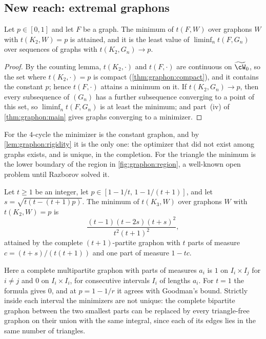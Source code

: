 \begin{refsection}
\subsection{New reach: extremal graphons}

\begin{corollary}\label{cor:graphon:extremal}
Let $p\in[0,1]$ and let $F$ be a graph. The minimum of $t(F,W)$ over graphons $W$ with $t(K_2,W)=p$ is attained, and it is the least value of $\liminf_n t(F,G_n)$ over sequences of graphs with $t(K_2,G_n)\to p$.
\end{corollary}

\begin{proof}
By the counting lemma, $t(K_2,\cdot)$ and $t(F,\cdot)$ are continuous on $\graphonspace$, so the set where $t(K_2,\cdot)=p$ is compact (\cref{thm:graphon:compact}), and it contains the constant $p$; hence $t(F,\cdot)$ attains a minimum on it. If $t(K_2,G_n)\to p$, then every subsequence of $(G_n)$ has a further subsequence converging to a point of this set, so $\liminf_nt(F,G_n)$ is at least the minimum; and part~(iv) of \cref{thm:graphon:main} gives graphs converging to a minimizer.
\end{proof}

For the $4$-cycle the minimizer is the constant graphon, and by \cref{lem:graphon:rigidity} it is the only one: the optimizer that did not exist among graphs exists, and is unique, in the completion. For the triangle the minimum is the lower boundary of the region in \cref{fig:graphon:region}, a well-known open problem until Razborov solved it.

\begin{theorem}\label{thm:graphon:razborov}
Let $t\ge1$ be an integer, let $p\in[1-1/t,\,1-1/(t+1)]$, and let $s=\sqrt{t(t-(t+1)p)}$. The minimum of $t(K_3,W)$ over graphons $W$ with $t(K_2,W)=p$ is
\[
  \frac{(t-1)(t-2s)(t+s)^2}{t^2(t+1)^2},
\]
attained by the complete $(t+1)$-partite graphon with $t$ parts of measure $c=(t+s)/(t(t+1))$ and one part of measure $1-tc$.
\end{theorem}

Here a complete multipartite graphon with parts of measures $a_i$ is $1$ on $I_i\times I_j$ for $i\ne j$ and $0$ on $I_i\times I_i$, for consecutive intervals $I_i$ of lengths $a_i$. For $t=1$ the formula gives $0$, and at $p=1-1/r$ it agrees with Goodman's bound. Strictly inside each interval the minimizers are not unique: the complete bipartite graphon between the two smallest parts can be replaced by every triangle-free graphon on their union with the same integral, since each of its edges lies in the same number of triangles.


\end{refsection}
